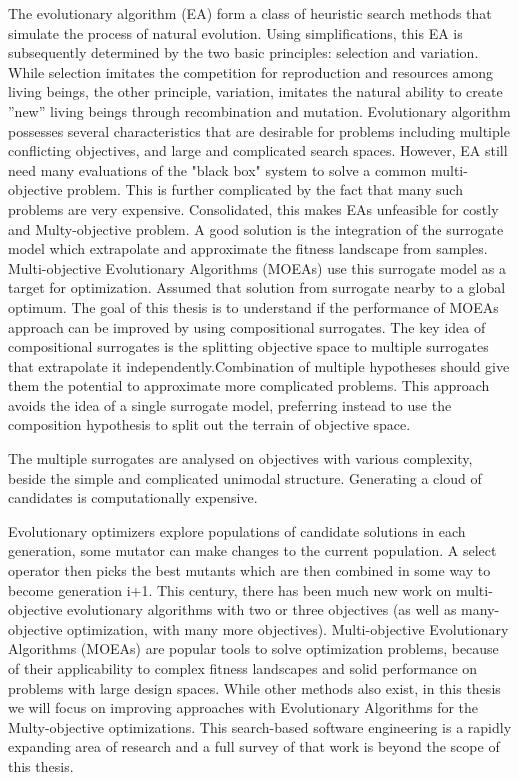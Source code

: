                 The evolutionary algorithm (EA) form a class of heuristic search methods that simulate the process of natural evolution.
                Using simplifications, this EA is subsequently determined by the two basic principles: selection and variation.
                While selection imitates the competition for reproduction and resources among living beings, the other principle, variation, imitates the natural ability to create ”new” living beings through recombination and mutation. Evolutionary algorithm possesses several characteristics that are desirable for problems including multiple conflicting objectives, and large and complicated search spaces. However, EA still need many evaluations of the "black box" system to solve a common multi-objective problem. This is further complicated by the fact that many such problems are very expensive. Consolidated, this makes EAs unfeasible for costly and Multy-objective problem.
                A good solution is the integration of the surrogate model which extrapolate and approximate the fitness landscape from samples. Multi-objective Evolutionary Algorithms (MOEAs) use this surrogate model as a target for optimization. Assumed that solution from surrogate nearby to a global optimum.
                The goal of this thesis is to understand if the performance of MOEAs approach can be improved by using compositional surrogates. The key idea of compositional surrogates is the splitting objective space to multiple surrogates that extrapolate it independently.Combination of multiple hypotheses should give them the potential to approximate more complicated problems. This approach avoids the idea of a single surrogate model, preferring instead to use the composition hypothesis to split out the terrain of objective space.

                The multiple surrogates are analysed on objectives with various complexity, beside the simple and complicated unimodal structure. Generating a cloud of candidates is computationally expensive.

                Evolutionary optimizers explore populations of candidate solutions in each generation, some mutator can make changes to the current population. A select operator then picks the best mutants which are then combined in some way to become generation i+1. 
                This century, there has been much new work on multi-objective evolutionary algorithms with two or three objectives 
                (as well as many-objective optimization, with many more objectives). Multi-objective Evolutionary Algorithms (MOEAs) are popular tools to solve optimization problems, because of their applicability to complex fitness landscapes and solid performance on problems with large design spaces. While other methods also exist, in this thesis we will focus on improving approaches with Evolutionary Algorithms for the Multy-objective optimizations.
                This search-based software engineering is a rapidly expanding area of research and a full survey of that work is 
                beyond the scope of this thesis.

